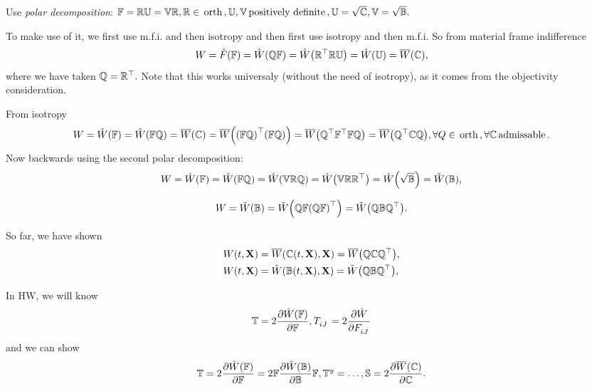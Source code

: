 \documentclass[reqno, a4paper]{article}
\begin{document}
Use \textit{polar decomposition}: $\mathbb{F} = \mathbb{R}\mathbb{U} = \mathbb{V}\mathbb{R}, \mathbb{R} \in \, \text{orth} \,, \mathbb{U,V} \, \text{positively definite} \,, \mathbb{U} = \sqrt{\mathbb{C}}, \mathbb{V} = \sqrt{\mathbb{B}}.$ 

To make use of it, we first use m.f.i. and then isotropy and then first use isotropy and then m.f.i.
So from material frame indifference
\[
	W = \hat{F}\qty(\mathbb{F}) = \hat{W}\qty(\mathbb{Q}\mathbb{F}) = \hat{W}\qty(\mathbb{R}^\top \mathbb{R} \mathbb{U}) = \hat{W}\qty(\mathbb{U}) = \overline{W}\qty(\mathbb{C}),
\]
where we have taken $\mathbb{Q} = \mathbb{R}^\top.$ Note that this works universaly (without the need of isotropy), as it comes from the objectivity consideration.

From isotropy
\[
	W = \hat{W}\qty(\mathbb{F}) = \hat{W}\qty(\mathbb{F} \mathbb{Q}) = \overline{W}\qty(\mathbb{C}) = \overline{W}\qty(\qty(\mathbb{F} \mathbb{Q})^\top \qty(\mathbb{F} \mathbb{Q})) = \overline{W}\qty(\mathbb{Q}^\top \mathbb{F}^\top\mathbb{F} \mathbb{Q}) = \overline{W}\qty(\mathbb{Q}^\top\mathbb{C} \mathbb{Q}), \forall Q \in \, \text{orth} \,, \forall \mathbb{C} \, \text{admissable} \,.
\]
Now backwards using the second polar decomposition:
\[
	W = \hat{W}\qty(\mathbb{F}) = \hat{W}\qty(\mathbb{F} \mathbb{Q}) = \hat{W}\qty(\mathbb{V}\mathbb{R}\mathbb{Q}) = \hat{W}\qty(\mathbb{V}\mathbb{R}\mathbb{R}^\top) = \hat{W}\qty(\sqrt{\mathbb{B}}) = \tilde{W}\qty(\mathbb{B}),
\]

\[
	W = \tilde{W}\qty(\mathbb{B}) = \tilde{W}\qty(\mathbb{Q}\mathbb{F} \qty(\mathbb{Q}\mathbb{F})^\top) = \tilde{W}\qty(\mathbb{Q}\mathbb{B} \mathbb{Q}^\top).
\]

So far, we have shown
\begin{align*}
	W\qty(t,\vb{X}) &= \overline{W}\qty(\mathbb{C}\qty(t,\vb{X}),\vb{X}) = \overline{W}\qty(\mathbb{Q}\mathbb{C} \mathbb{Q}^\top), \\ W\qty(t,\vb{X}) &= \tilde{W}\qty(\mathbb{B}(t,\vb{X}), \vb{X}) = \tilde{W}\qty(\mathbb{Q} \mathbb{B} \mathbb{Q}^\top),
\end{align*}

In HW, we will know
\[
	\pkstress = 2 \pdv{\hat{W}\qty(\fgrad)}{\fgrad}, T \indices{_{iJ}} = 2 \pdv{\hat{W}}{F \indices{_{iJ}}}
\]
and we can show
\[
	\mathbb{T} = 2\pdv{\hat{W}\qty(\ensuremath{\mathbb{F}})}{\ensuremath{\mathbb{F}}} = 2 \mathbb{F} \pdv{\tilde{W}\qty(\ensuremath{\mathbb{B}})}{\ensuremath{\mathbb{B}}}\mathbb{F}, \mathbb{T}^y  = \dots, \mathbb{S} = 2 \pdv{\overline{W}\qty(\ensuremath{\mathbb{C}})}{\ensuremath{\mathbb{C}}}.
\]
\end{document}
